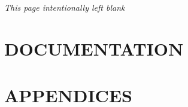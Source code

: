 \documentclass[a4paper,14.50pt]{book} \usepackage{color} \usepackage[usenames,dvipsnames,svgnames,table,x11names]{xcolor}
\makeatletter
\def\cleardoublepage{\clearpage%
        \if@twoside
            \ifodd\c@page\else
                \vspace*{\fill}
                \hfill
                \begin{center}
                \emph{This page intentionally left blank}
                \end{center}
                \vspace{\fill}
                \thispagestyle{empty}
                \newpage
                \if@twocolumn\hbox{}\newpage\fi
            \fi
        \fi
    }
\makeatother
\begin{document}
\cleardoublepage

\renewcommand{\headrulewidth}{0.2pt}

\part{DOCUMENTATION}

%
%
%
%
%
%
%
%


\part{APPENDICES}
\appendix
%

\printglossary
\printindex
\end{document}
